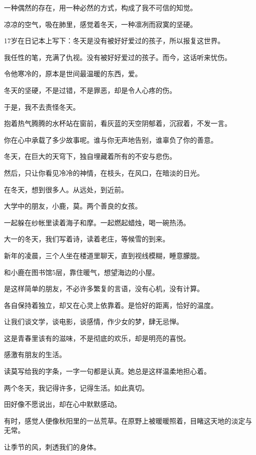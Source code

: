 		一种偶然的存在，用一种必然的方式，构成了我不可信的知觉。\par
		凉凉的空气，吸在肺里，感觉着冬天，一种凛冽而寂寞的坚硬。\par
		17岁在日记本上写下：冬天是没有被好好爱过的孩子，所以报复这世界。\par
		我任性的笔，充满了仇视。没有被好好爱过的孩子。而今，这话听来忧伤。\par
		令他寒冷的，原本是世间最温暖的东西，爱。\par
		冬天的坚硬，不是过错，不是罪恶，却是令人心疼的伤。\par
		于是，我不去责怪冬天。\par
		抱着热气腾腾的水杯站在窗前，看灰蓝的天空阴郁着，沉寂着，不发一言。\par
		你在心中承载了多少故事呢。谁与你无声地告别，谁辜负了你的善意。\par
		冬天，在巨大的天穹下，独自埋藏着所有的不安与悲伤。\par
		然后，只让你看见冷冷的神情，在枝头，在风口，在暗淡的日光。\par
		在冬天，想到很多人。从远处，到近前。\par
		大学中的朋友，小鹿，莫。两个善良的女孩。\par
		一起躲在纱帐里读着海子和摩。一起燃起蜡烛，喝一碗热汤。\par
		大一的冬天，我们写着诗，读着老庄，等候雪的到来。\par
		新年的凌晨，三个人坐在楼道里聊天，直到视线模糊，睡意朦胧。\par
		和小鹿在图书馆5层，靠住暖气，想望海边的小屋。\par
		是这样简单的朋友，不必许多繁复的言语，没有心机，没有计算。\par
		各自保持着独立，却又在心灵上依靠着。是恰好的距离，恰好的温度。\par
		让我们谈文学，谈电影，谈感情，作少女的梦，肆无忌惮。\par
		这是青春里该有的滋味，不是彻底的欢乐，却是明亮的喜悦。\par
		感激有朋友的生活。\par
		读莫写给我的字条，一字一句都是认真。她总是这样温柔地担心着。\par
		两个冬天，我记得许多，记得生活。如此真切。\par
		田好像不愿说出，却在心中默默感动。\par
		有时，感觉人便像秋阳里的一丛荒草。在原野上被暖暖照着，目睹这天地的淡定与无常。\par
		让季节的风，刺透我们的身体。\par
